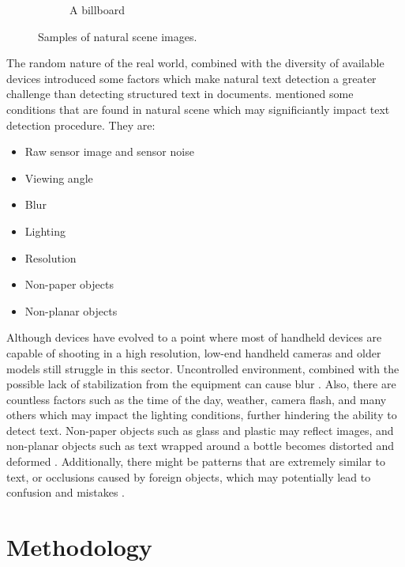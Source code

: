\documentclass[10pt, a4paper]{article}
\begin{document}
\begin{figure}[h!]
\begin{subfigure}[b]{0.4\linewidth}
		\caption{A billboard}
	  \end{subfigure}
	\caption{Samples of natural scene images.}
	\label{fig:samples}
  \end{figure}

The random nature of the real world, combined with the diversity of available devices introduced some factors which make natural text detection a greater challenge than detecting structured text in documents. \cite{NaturalScene} mentioned some conditions that are found in natural scene which may significiantly impact text detection procedure. They are:
\begin{itemize}
	\item Raw sensor image and sensor noise
	\item Viewing angle
	\item Blur
	\item Lighting
	\item Resolution
	\item Non-paper objects
	\item Non-planar objects
\end{itemize}
Although devices have evolved to a point where most of handheld devices are capable of shooting in a high resolution, low-end handheld cameras and older models still struggle in this sector.
Uncontrolled environment, combined with the possible lack of stabilization from the equipment can cause blur \citep{Rosebrockeast}. Also, there are countless factors such as the time of the day, weather, camera flash, and many others which may impact the lighting conditions, further hindering the ability to detect text. Non-paper objects such as glass and plastic may reflect images, and non-planar objects such as text wrapped around a bottle becomes distorted and deformed \citep{Rosebrockeast}.
Additionally, there might be patterns that are extremely similar to text, or occlusions caused by foreign objects, which may potentially lead to confusion and mistakes \citep{LongEtAl}.

\clearpage

\section{Methodology} %
\label{sec:methodology}
\end{document}

